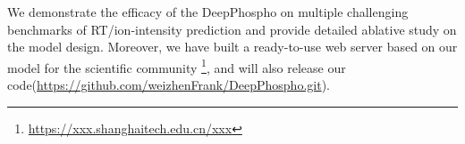 We demonstrate the efficacy of the DeepPhospho on multiple challenging benchmarks of RT/ion-intensity prediction and provide detailed ablative study on the model design. Moreover, we have built a ready-to-use web server based on our model for the scientific community \footnote{\url{https://xxx.shanghaitech.edu.cn/xxx}}, and will also release our code(\url{https://github.com/weizhenFrank/DeepPhospho.git}).











